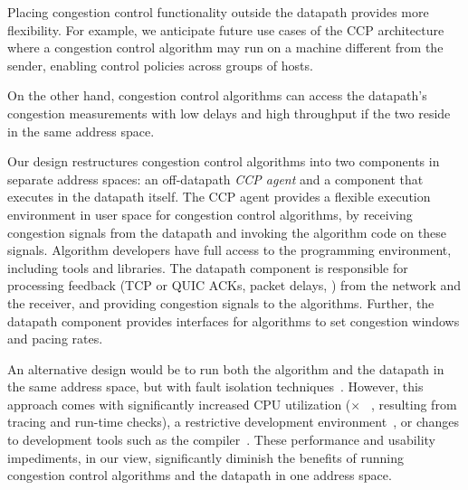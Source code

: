  Placing congestion control functionality outside the datapath provides more flexibility. For example, we anticipate future use cases of the CCP architecture where
a congestion control algorithm may run on a machine different from the sender,
enabling control policies across groups of hosts.

 On the other hand, congestion control algorithms can access the datapath's
congestion measurements with low delays and high throughput if the two reside in
the same address space.

Our design restructures congestion control algorithms into two components in
separate address spaces: an off-datapath {\em CCP agent} and a component that
executes in the datapath itself.
%
The CCP agent provides a flexible execution environment in user space for congestion control algorithms, by receiving congestion signals from the datapath
and invoking the algorithm code on these signals.
%
Algorithm developers have full access to the \userspace programming environment, including tools and libraries.
%
The datapath component is responsible for processing feedback (\eg TCP or QUIC
ACKs, packet delays, \etc) from the network and the receiver, and providing congestion signals to the algorithms.
%
Further, the datapath component provides interfaces for algorithms to set
congestion windows and pacing rates.

An alternative design would be to run both the algorithm and the datapath in the same address space, but with fault isolation techniques~\cite{sfi, xfi, bgi, lxfi, nacl, janus, systrace}. 
However, this approach comes with significantly increased CPU utilization ($\times$ ~\cite{lxfi, sfi, bgi, janus, systrace}, resulting from tracing and run-time checks), a restrictive development environment~\cite{nacl}, or changes to development tools such as the compiler~\cite{xfi, sfi}.
These performance and usability impediments, in our view, significantly diminish the benefits of running congestion control algorithms and the datapath in one address space.



